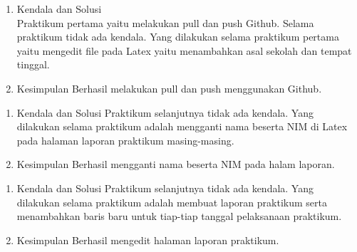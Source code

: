 
\begin{enumerate}
\item Kendala dan Solusi \\
Praktikum pertama yaitu melakukan pull dan push Github. Selama praktikum tidak ada kendala. Yang dilakukan selama praktikum pertama yaitu mengedit file pada Latex yaitu menambahkan asal sekolah dan tempat tinggal.


\item Kesimpulan
\newline Berhasil melakukan pull dan push menggunakan Github. 


\end{enumerate}

\begin{enumerate}
\item Kendala dan Solusi
\newline Praktikum selanjutnya tidak ada kendala. Yang dilakukan selama praktikum adalah mengganti nama beserta NIM di Latex pada halaman laporan praktikum masing-masing.

\item Kesimpulan
\newline Berhasil mengganti nama beserta NIM pada halam laporan.

\end{enumerate}


\begin{enumerate}
\item Kendala dan Solusi
\newline Praktikum selanjutnya tidak ada kendala. Yang dilakukan selama praktikum adalah membuat laporan praktikum serta menambahkan baris baru untuk tiap-tiap tanggal pelaksanaan praktikum.

\item Kesimpulan
\newline Berhasil mengedit halaman laporan praktikum.

\end{enumerate}

